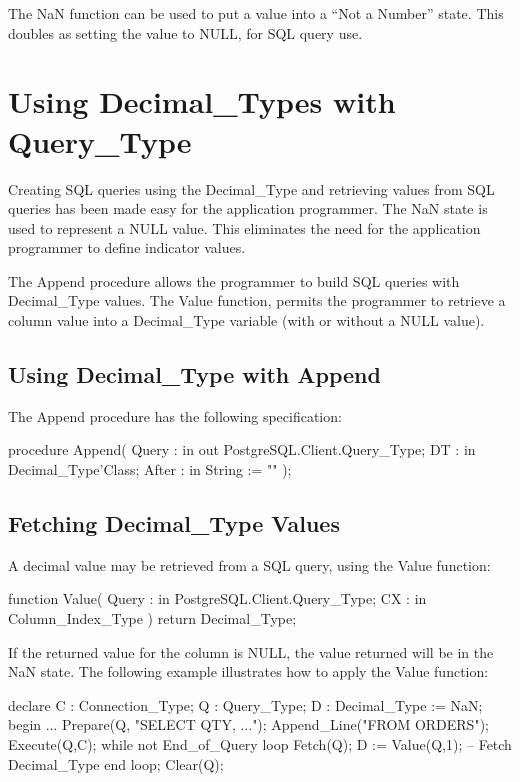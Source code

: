 \documentclass[english,letterpaper]{book}
\begin{document}
The NaN function can be used to put a value into a ``Not a Number''
state. This doubles as setting the value to NULL, for SQL query use.


\section{Using Decimal\_Types with Query\_Type}

Creating SQL queries using the Decimal\_Type and retrieving values
from SQL queries has been made easy for the application programmer.
The NaN state is used to represent a NULL value. This eliminates the
need for the application programmer to define indicator values.

The Append procedure allows the programmer to build SQL queries with
Decimal\_Type values. The Value function, permits the programmer to
retrieve a column value into a Decimal\_Type variable (with or without
a NULL value).


\subsection{Using Decimal\_Type with Append}

The Append procedure has the following specification:

\begin{Code}
procedure Append(
   Query : in out PostgreSQL.Client.Query_Type;
   DT :    in     Decimal_Type'Class;
   After : in     String := ""
);
\end{Code}

\subsection{Fetching Decimal\_Type Values}

A decimal value may be retrieved from a SQL query, using the Value
function:

\begin{Code}
function Value(
   Query : in PostgreSQL.Client.Query_Type;
   CX :    in Column_Index_Type
) return Decimal_Type;
\end{Code}

If the returned value for the column is NULL, the value
returned will be in the NaN state. The following example illustrates
how to apply the Value function:

\begin{Example}
declare
   C : Connection_Type;
   Q : Query_Type;
   D : Decimal_Type := NaN;
begin
   ...
   Prepare(Q,  "SELECT QTY, ...");
   Append_Line("FROM ORDERS");
   Execute(Q,C);
   while not End_of_Query loop
      Fetch(Q);
      D := Value(Q,1);  -- Fetch Decimal_Type
   end loop;
   Clear(Q);
\end{Example}
\end{document}
